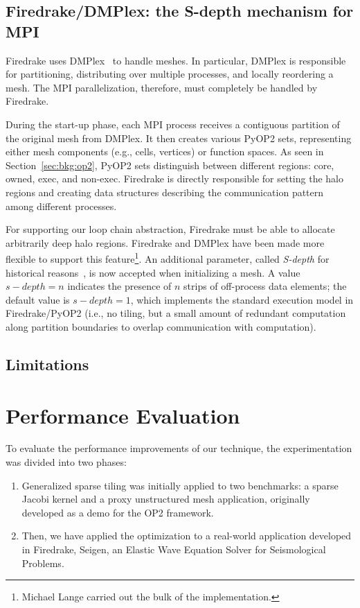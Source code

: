 \subsection{Firedrake/DMPlex: the S-depth mechanism for MPI}
\label{sec:tiling:impl-firedrake}
Firedrake uses DMPlex~\cite{dmplex} to handle meshes. In particular, DMPlex is responsible for partitioning, distributing over multiple processes, and locally reordering a mesh. The MPI parallelization, therefore, must completely be handled by Firedrake.

During the start-up phase, each MPI process receives a contiguous partition of the original mesh from DMPlex. It then creates various PyOP2 sets, representing either mesh components (e.g., cells, vertices) or function spaces. As seen in Section~\ref{sec:bkg:op2}, PyOP2 sets distinguish between different regions: core, owned, exec, and non-exec. Firedrake is directly responsible for setting the halo regions and creating data structures describing the communication pattern among different processes.

For supporting our loop chain abstraction, Firedrake must be able to allocate arbitrarily deep halo regions. Firedrake and DMPlex have been made more flexible to support this feature\footnote{Michael Lange carried out the bulk of the implementation.}. An additional parameter, called {\em S-depth} for historical reasons~\cite{s-depth-paper}, is now accepted when initializing a mesh. A value $s-depth = n$ indicates the presence of $n$ strips of off-process data elements; the default value is $s-depth = 1$, which implements the standard execution model in Firedrake/PyOP2 (i.e., no tiling, but a small amount of redundant computation along partition boundaries to overlap communication with computation).

\subsection{Limitations}

\section{Performance Evaluation}
To evaluate the performance improvements of our technique, the experimentation was divided into two phases:
\begin{enumerate}
\item Generalized sparse tiling was initially applied to two benchmarks: a sparse Jacobi kernel and a proxy unstructured mesh application, originally developed as a demo for the OP2 framework. 
\item Then, we have applied the optimization to a real-world application developed in Firedrake, Seigen, an Elastic Wave Equation Solver for Seismological Problems. 
\end{enumerate}

